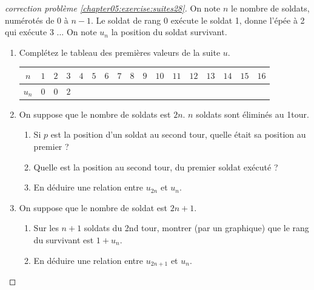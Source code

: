 \documentclass[main.tex]{subfiles}
\begin{document}
\begin{proof}[correction problème \ref{chapter05:exercise:suites28}]  
	
On note $n$ le nombre de soldats, numérotés de $0$ à $n-1$. Le soldat de rang 0 exécute le soldat 1, donne l'épée à 2 qui exécute 3 ... On note $u_n$ la position du soldat survivant.   
\begin{enumerate}[label=\arabic*),leftmargin=*] 
	\item Complétez le tableau des premières valeurs de la suite $u$.\\ 
	\renewcommand{\arraystretch}{1.5}
\begin{tabularx}{0.99\linewidth}{|c|*{16}{Y|}} \hline   
$n$ & $1$ & $2$ & $3$ & $4$ & $5$ & $6$ & $7$ & $8$& $9$ & $10$& $11$& $12$& $13$& $14$ & $15$ & $16$\\ \hline    
$u_n$ & $0$ & $0$ & $2$ &   &   &  &   & & &&&&&&&\\ \hline   
\end{tabularx}	 
\item 	
	On suppose que le nombre de soldats est $2n$. $n$ soldats sont éliminés au 1\ier tour.
	\begin{enumerate}[label=\alph*),leftmargin=*] 
		\item Si $p$ est la position d'un soldat au second tour, quelle était sa position au premier ? 
		\item Quelle est la position au second tour, du premier soldat exécuté ? 
		\item En déduire une relation entre $u_{2n}$ et $u_n$.
	\end{enumerate}
\item On suppose que le nombre de soldat est $2n+1$.  
\begin{enumerate}[label=\alph*),leftmargin=*] 
	\item Sur les $n+1$ soldats du 2nd tour, montrer (par un graphique) que le rang du survivant est $1+u_n$.
	\item En déduire une relation entre $u_{2n+1}$ et $u_{n}$.
\end{enumerate}

\end{enumerate}
\end{proof}
\end{document}
